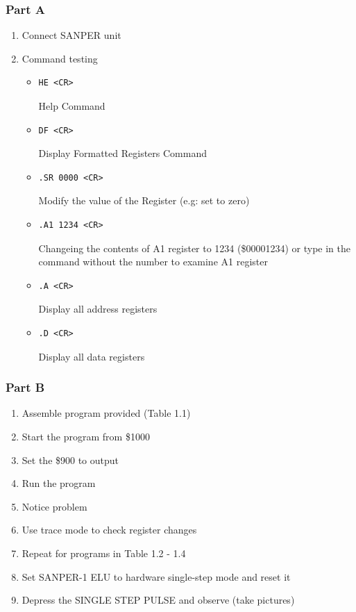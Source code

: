 \documentclass{article}
\begin{document}
	\subsubsection{Part A}
		\begin{enumerate}[label=(\alph*)]
		\item Connect SANPER unit
		\item Command testing
			\begin{itemize}
				\item \begin{verbatim}HE <CR>\end{verbatim}  Help Command
				\item \begin{verbatim}DF <CR>\end{verbatim}  Display Formatted Registers Command
				\item \begin{verbatim}.SR 0000 <CR>\end{verbatim}  Modify the value of the Register (e.g: set to zero)
				\item \begin{verbatim}.A1 1234 <CR>\end{verbatim}  Changeing the contents of A1 register to 1234 (\$00001234) or type in the command without the number to examine A1 register
				\item \begin{verbatim}.A <CR>\end{verbatim}  Display all address registers
				\item \begin{verbatim}.D <CR>\end{verbatim}  Display all data registers
			\end{itemize}
		\end{enumerate}
	\subsubsection{Part B}
		\begin{enumerate}[label=(\alph*)]
			\item Assemble program provided (Table 1.1)
			\item Start the program from \$1000
			\item Set the \$900 to output
			\item Run the program
			\item Notice problem
			\item Use trace mode to check register changes
			\item Repeat for programs in Table 1.2 - 1.4
			\item Set SANPER-1 ELU to hardware single-step mode and reset it
			\item Depress the SINGLE STEP PULSE and observe (take pictures)
		\end{enumerate}
\end{document}
